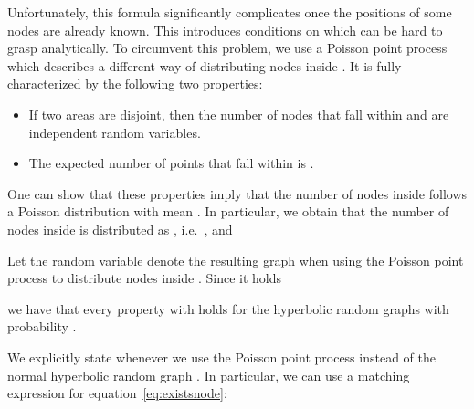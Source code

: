 \documentclass{llncs}
\newcommand{\eq}[1]{equation~\eqref{eq:#1}}
\begin{document}
Unfortunately, this formula significantly complicates once the positions of some nodes are already known. This introduces conditions on  which can be hard to grasp analytically. To circumvent this problem, we use a Poisson point process  \cite{penrose2003random} which describes a different way of distributing nodes inside . It is fully characterized by the following two properties:
\begin{itemize}
\item If two areas  are disjoint, then the number of nodes that fall within  and  are independent random variables.
\item The expected number of points that fall within  is .
\end{itemize}
One can show that these properties imply that the number of nodes inside  follows a Poisson distribution with mean . In particular, we obtain that the number of nodes  inside  is distributed as , i.e.\ , and 

Let the random variable  denote the resulting graph when using the Poisson point process to distribute nodes inside . Since it holds

we have that every property  with  holds for the hyperbolic random graphs with probability .

We explicitly state whenever we use the Poisson point process  instead of the normal hyperbolic random graph . In particular, we can use a matching expression for \eq{existsnode}:
\end{document}
